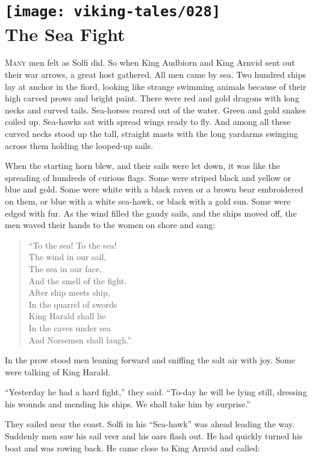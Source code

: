 \section[The Sea Fight]{
    \texttt{[image: viking-tales/028]}\\
    The Sea Fight}

\lettrine{M}{any} men felt as Solfi did. So when King Audbiorn and King
Arnvid sent out their war arrows, a great host gathered. All men came by
sea. Two hundred ships lay at anchor in the fiord, looking like strange
swimming animals because of their high carved prows and bright paint.
There were red and gold dragons with long necks and curved tails.
Sea-horses reared out of the water. Green and gold snakes coiled up.
Sea-hawks sat with spread wings ready to fly. And among all these curved
necks stood up the tall, straight masts with the long yardarms swinging
across them holding the looped-up sails.

When the starting horn blew, and their sails were let down, it was like
the spreading of hundreds of curious flags. Some were striped black and
yellow or blue and gold. Some were white with a black raven or a brown
bear embroidered on them, or blue with a white sea-hawk, or black with a
gold sun. Some were edged with fur. As the wind filled the gaudy sails,
and the ships moved off, the men waved their hands to the women on shore
and sang:

\begin{quote}
``To the sea! To the sea!\\
The wind in our sail,\\
The sea in our face,\\
And the smell of the fight.\\
After ship meets ship,\\
In the quarrel of swords\\
King Harald shall lie\\
In the caves under sea\\
And Norsemen shall laugh.''
\end{quote}

In the prow stood men leaning forward and sniffing the salt air with
joy. Some were talking of King Harald.

``Yesterday he had a hard fight,'' they said. ``To-day he will be lying
still, dressing his wounds and mending his ships. We shall take him by
surprise.''

They sailed near the coast. Solfi in his ``Sea-hawk'' was ahead leading
the way. Suddenly men saw his sail veer and his oars flash out. He had
quickly turned his boat and was rowing back. He came close to King
Arnvid and called:

